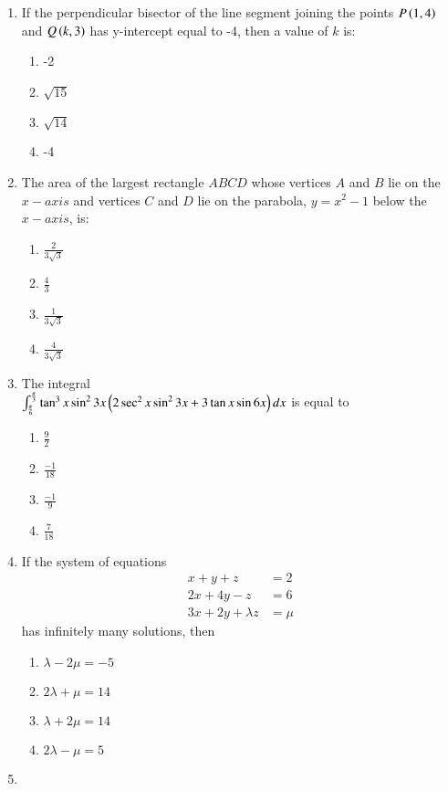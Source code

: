 \documentclass[journal]{IEEEtran}
\begin{document}
\begin{enumerate}
	\item
	If the perpendicular bisector of the line segment joining the points $P\left(1 ,4\right)$ and $Q\left(k, 3\right)$ has y-intercept equal to -4, then a value of $k$ is:
		\begin{enumerate}
			\item -2
			\item $\sqrt{15}$
			\item $\sqrt{14}$
			\item -4
		\end{enumerate}
	\item
	The area  of the largest rectangle $ABCD$ whose vertices $A$ and $B$ lie on the $x-axis$ and vertices $C$ and $D$ lie on the parabola, $y = x^{2}-1$ below 			the $x-axis$, is:
		\begin{enumerate}
			\item $\frac{2}{3\sqrt{3}}$
			\item $\frac{4}{3}$
			\item $\frac{1}{3\sqrt{3}}$
			\item $\frac{4}{3\sqrt{3}}$
		\end{enumerate}
	\item
	The integral \\
	$\int_{\frac{\pi}{6}}^{\frac{\pi}{3}} \tan^{3}{x}\sin^{2}{3x}\left(2\sec^{2}{x}\sin^{2}{3x} + 3\tan{x}\sin{6x}\right) dx$ is equal to 
		\begin{enumerate}
			\item $\frac{9}{2}$
			\item $\frac{-1}{18}$
			\item $\frac{-1}{9}$
			\item $\frac{7}{18}$
		\end{enumerate}
	\item
	If the system of equations
	\begin{align}
	x + y + z &= 2 \\
	2x + 4y - z &= 6 \\
	3x + 2y + \lambda z &=\mu
	\end{align}
	has infinitely many solutions, then
		\begin{enumerate}
			\item $\lambda - 2\mu = -5$
			\item $2\lambda + \mu = 14$
			\item $\lambda + 2\mu = 14$
			\item $2\lambda - \mu = 5$
		\end{enumerate}
	\item 

\end{enumerate}
\end{document}
